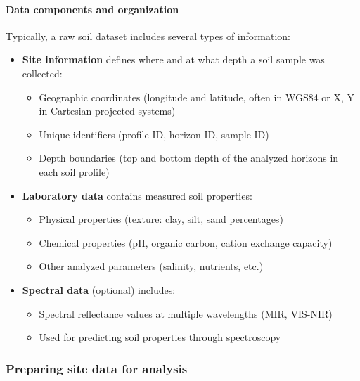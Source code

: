 \documentclass[
  10pt,
  b5paper,
  oneside]{book}
\providecommand{\tightlist}{%
  \setlength{\itemsep}{0pt}\setlength{\parskip}{0pt}}
\begin{document}
\paragraph*{Data components and organization}\label{data-components-and-organization}

Typically, a raw soil dataset includes several types of information:

\begin{itemize}
\tightlist
\item
  \textbf{Site information} defines where and at what depth a soil sample was collected:

  \begin{itemize}
  \tightlist
  \item
    Geographic coordinates (longitude and latitude, often in WGS84 or X, Y in Cartesian projected systems)
  \item
    Unique identifiers (profile ID, horizon ID, sample ID)
  \item
    Depth boundaries (top and bottom depth of the analyzed horizons in each soil profile)
  \end{itemize}
\item
  \textbf{Laboratory data} contains measured soil properties:

  \begin{itemize}
  \tightlist
  \item
    Physical properties (texture: clay, silt, sand percentages)
  \item
    Chemical properties (pH, organic carbon, cation exchange capacity)
  \item
    Other analyzed parameters (salinity, nutrients, etc.)
  \end{itemize}
\item
  \textbf{Spectral data} (optional) includes:

  \begin{itemize}
  \tightlist
  \item
    Spectral reflectance values at multiple wavelengths (MIR, VIS-NIR)
  \item
    Used for predicting soil properties through spectroscopy
  \end{itemize}
\end{itemize}

\subsubsection{Preparing site data for analysis}\label{preparing-site-data-for-analysis}
\end{document}
